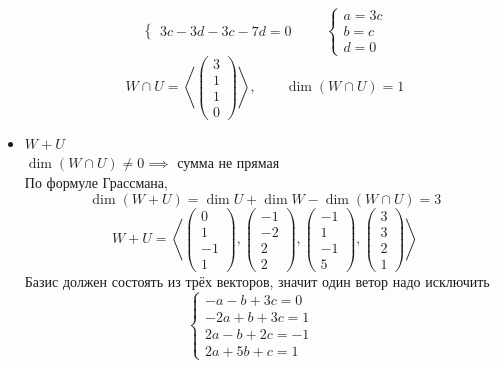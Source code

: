 \begin{itemize}
$$\begin{cases}
        3c - 3d - 3c - 7d = 0
    \end{cases} \qquad
    \begin{cases}
    	a = 3c \\
        b = c \\
        d = 0
    \end{cases} $$
    $$ W \cap U = \left\langle
    \begin{pmatrix}
    	3 \\
        1 \\
        1 \\
        0
    \end{pmatrix} \right\rangle, \qquad \dim (W \cap U) = 1 $$
    \item $ W + U $ \\
    $ \dim(W \cap U) \ne 0 \implies $ сумма не прямая \\
    По формуле Грассмана,
    $$ \dim(W + U) = \dim U + \dim W - \dim(W \cap U) = 3 $$
    $$ W + U = \left\langle
    \begin{pmatrix}
    	0 \\
        1 \\
        -1 \\
        1
    \end{pmatrix},
    \begin{pmatrix}
    	-1 \\
        -2 \\
        2 \\
        2
    \end{pmatrix},
    \begin{pmatrix}
    	-1 \\
        1 \\
        -1 \\
        5
    \end{pmatrix},
    \begin{pmatrix}
    	3 \\
        3 \\
        2 \\
        1
    \end{pmatrix} \right\rangle $$
    Базис должен состоять из трёх векторов, значит один ветор надо исключить
    $$
    \begin{cases}
    	-a - b + 3c = 0 \\
        -2a + b + 3c = 1 \\
        2a - b + 2c = -1 \\
        2a + 5b + c = 1
    \end{cases} \qquad
$$
\end{itemize}
